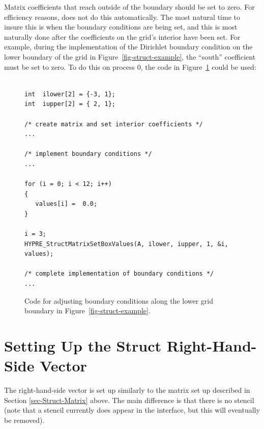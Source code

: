 Matrix coefficients that reach outside of the boundary should be set to zero.
For efficiency reasons, \hypre{} does not do this automatically.  The most
natural time to insure this is when the boundary conditions are being set, and
this is most naturally done after the coefficients on the grid's interior have
been set.  For example, during the implementation of the Dirichlet boundary
condition on the lower boundary of the grid in Figure~\ref{fig-struct-example},
the ``south'' coefficient must be set to zero.  To do this on process 0, the
code in Figure~\ref{fig-struct-matrix-boundary} could be used:
\begin{figure}
\centering
\begin{minipage}{0.8\textwidth}
\begin{verbatim}

int  ilower[2] = {-3, 1};
int  iupper[2] = { 2, 1};

/* create matrix and set interior coefficients */
...

/* implement boundary conditions */
...

for (i = 0; i < 12; i++)
{
   values[i] =  0.0;
}

i = 3;
HYPRE_StructMatrixSetBoxValues(A, ilower, iupper, 1, &i, values);

/* complete implementation of boundary conditions */
...

\end{verbatim}
\end{minipage}
\caption{%
Code for adjusting boundary conditions along the lower grid boundary in
Figure~\ref{fig-struct-example}.}
\label{fig-struct-matrix-boundary}
\end{figure}


\section{Setting Up the Struct Right-Hand-Side Vector}
\label{sec-Struct-RHS}

The right-hand-side vector is set up similarly to the matrix set up described
in Section \ref{sec-Struct-Matrix} above.  The main difference is that there is
no stencil (note that a stencil currently does appear in the interface, but
this will eventually be removed).


